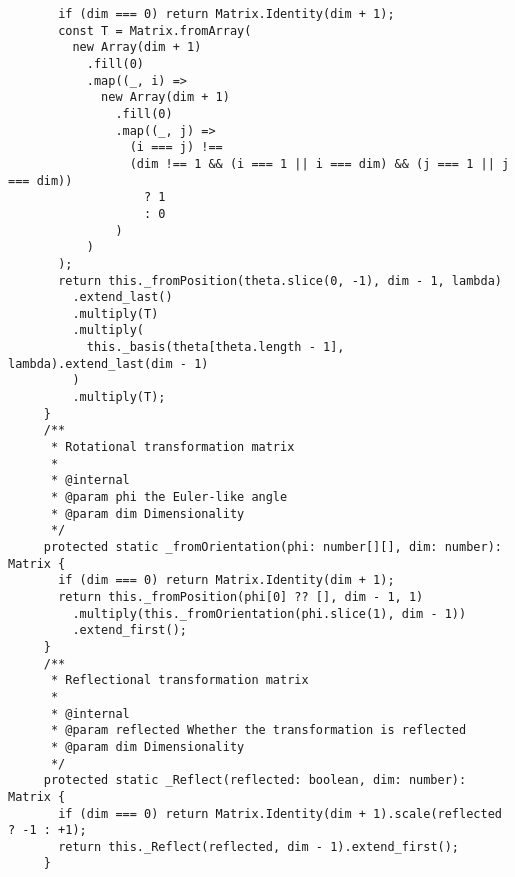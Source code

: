 \documentclass[../main.tex]{subfiles}
\begin{document}
\begin{verbatim}
       if (dim === 0) return Matrix.Identity(dim + 1);
       const T = Matrix.fromArray(
         new Array(dim + 1)
           .fill(0)
           .map((_, i) =>
             new Array(dim + 1)
               .fill(0)
               .map((_, j) =>
                 (i === j) !==
                 (dim !== 1 && (i === 1 || i === dim) && (j === 1 || j === dim))
                   ? 1
                   : 0
               )
           )
       );
       return this._fromPosition(theta.slice(0, -1), dim - 1, lambda)
         .extend_last()
         .multiply(T)
         .multiply(
           this._basis(theta[theta.length - 1], lambda).extend_last(dim - 1)
         )
         .multiply(T);
     }
     /**
      * Rotational transformation matrix
      *
      * @internal
      * @param phi the Euler-like angle
      * @param dim Dimensionality
      */
     protected static _fromOrientation(phi: number[][], dim: number): Matrix {
       if (dim === 0) return Matrix.Identity(dim + 1);
       return this._fromPosition(phi[0] ?? [], dim - 1, 1)
         .multiply(this._fromOrientation(phi.slice(1), dim - 1))
         .extend_first();
     }
     /**
      * Reflectional transformation matrix
      *
      * @internal
      * @param reflected Whether the transformation is reflected
      * @param dim Dimensionality
      */
     protected static _Reflect(reflected: boolean, dim: number): Matrix {
       if (dim === 0) return Matrix.Identity(dim + 1).scale(reflected ? -1 : +1);
       return this._Reflect(reflected, dim - 1).extend_first();
     }
   

\end{verbatim}
\end{document}
